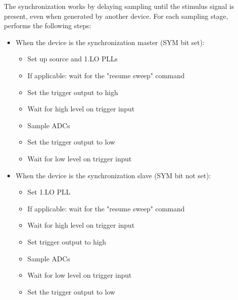 \documentclass{article}
\begin{document}
The synchronization works by delaying sampling until the stimulus signal is present, even when generated by another device. For each sampling stage, performs the following steps:
\begin{itemize}
\item When the device is the synchronization master (SYM bit set):
\begin{itemize}
\item Set up source and 1.LO PLLs
\item If applicable: wait for the "resume sweep" command
\item Set the trigger output to high
\item Wait for high level on trigger input
\item Sample ADCs
\item Set the trigger output to low
\item Wait for low level on trigger input
\end{itemize}
\item When the device is the synchronization slave (SYM bit not set):
\begin{itemize}
\item Set 1.LO PLL
\item If applicable: wait for the "resume sweep" command
\item Wait for high level on trigger input
\item Set trigger output to high
\item Sample ADCs
\item Wait for low level on trigger input
\item Set the trigger output to low
\end{itemize}
\end{itemize}
\end{document}
